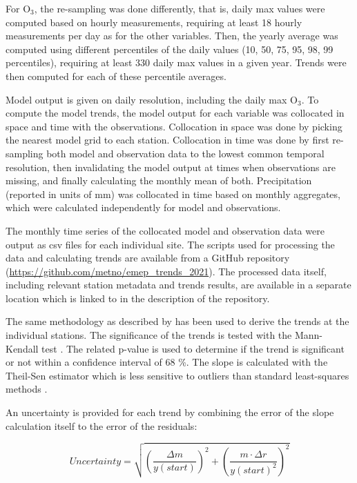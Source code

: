 For O$_3$, the re-sampling was done differently, that is, daily max values were computed based on hourly measurements, requiring at least 18 hourly measurements per day as for the other variables. Then, the yearly average was computed using different percentiles of the daily values (10, 50, 75, 95, 98, 99 percentiles), requiring at least 330 daily max values in a given year. Trends were then computed for each of these percentile averages.

Model output is given on daily resolution, including the daily max O$_3$. To compute the model trends, the model output for each variable was collocated in space and time with the observations. Collocation in space was done by picking the nearest model grid to each station. Collocation in time was done by first re-sampling both model and observation data to the lowest common temporal resolution, then invalidating the model output at times when observations are missing, and finally calculating the monthly mean of both. Precipitation (reported in units of mm) was collocated in time based on monthly aggregates, which were calculated independently for model and observations.

The monthly time series of the collocated model and observation data were output as csv files for each individual site. The scripts used for processing the data and calculating trends are available from a GitHub repository (\url{https://github.com/metno/emep_trends_2021}). The processed data itself, including relevant station metadata and trends results, are available in a separate location which is linked to in the description of the repository.

The same methodology as described by \cite{aas2019global, mortier2020} has been used to derive the trends at the individual stations. The significance of the trends is tested with the Mann-Kendall test \citep{hamed1998modified}. The related p-value is used to determine if the trend is significant or not within a confidence interval of 68 \%. The slope is calculated with the Theil-Sen estimator which is less sensitive to outliers than standard least-squares methods \citep{sen1968estimates}.

An uncertainty is provided for each trend by combining the error of the slope calculation itself to the error of the residuals:

\begin{equation}
 Uncertainty = \sqrt{{\left (\frac{\Delta m}{y(start)}\right )}^{2} + {\left ( \frac{m \cdot \Delta r}{y(start)^2}\right )}^{2} }
\end{equation}

